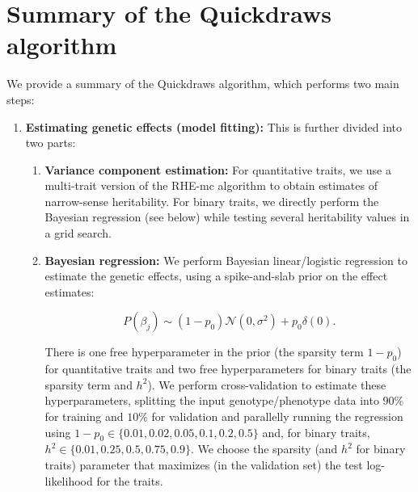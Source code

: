 \section{Summary of the Quickdraws algorithm}
\label{sec:ch4-summary}
%
We provide a summary of the Quickdraws algorithm, which performs two main steps:
%
\begin{enumerate}
    \item \textbf{Estimating genetic effects (model fitting):} This is further divided into two parts:
    \begin{enumerate}
        \item \textbf{Variance component estimation:}
        For quantitative traits, we use a multi-trait version of the RHE-mc algorithm \cite{wu2018scalable,pazokitoroudi2020efficient,kalantzis2023thesis,zhu2024ARGRHE} to obtain estimates of narrow-sense heritability.
        For binary traits, we directly perform the Bayesian regression (see below) while testing several heritability values in a grid search.
        \item \textbf{Bayesian regression: }
        We perform Bayesian linear/logistic regression to estimate the genetic effects, using a spike-and-slab prior on the effect estimates:
        
        \begin{equation}
            P(\beta_j) \sim (1-p_0)\mathcal{N} (0, \sigma ^ 2) + p_0 \delta(0).
        \end{equation}
        
        There is one free hyperparameter in the prior (the sparsity term $1-p_0$) for quantitative traits and two free hyperparameters for binary traits (the sparsity term and $h^2$).
        We perform cross-validation to estimate these hyperparameters, splitting the input genotype/phenotype data into $90\%$ for training and $10\%$ for validation and parallelly running the regression using $1-p_0 \in \{0.01, 0.02, 0.05, 0.1, 0.2, 0.5\}$ and, for binary traits, $h^2 \in \{0.01, 0.25, 0.5, 0.75, 0.9 \}$.
        We choose the sparsity (and $h^2$ for binary traits) parameter that maximizes (in the validation set) the test log-likelihood for the traits.


\end{enumerate}
\end{enumerate}
